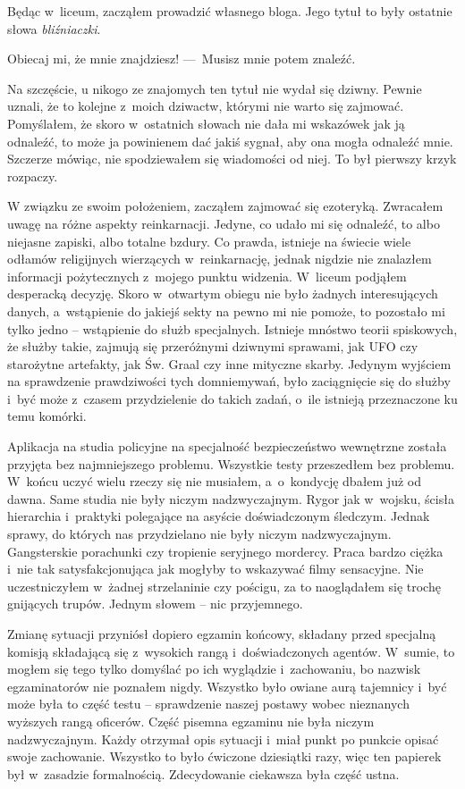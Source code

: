 Będąc w~liceum, zacząłem prowadzić własnego bloga. Jego tytuł to były ostatnie słowa \emph{bliźniaczki}. 

\begin{itquote}
Obiecaj mi, że mnie znajdziesz!
---~Musisz mnie potem znaleźć.
\end{itquote}

Na szczęście, u nikogo ze znajomych ten tytuł nie wydał się dziwny. Pewnie uznali, że to kolejne z~moich dziwactw, którymi nie warto się zajmować. Pomyślałem, że skoro w~ostatnich słowach nie dała mi wskazówek jak ją odnaleźć, to może ja powinienem dać jakiś sygnał, aby ona mogła odnaleźć mnie. Szczerze mówiąc, nie spodziewałem się wiadomości od niej. To był pierwszy krzyk rozpaczy. 

W związku ze swoim położeniem, zacząłem zajmować się ezoteryką. Zwracałem uwagę na różne aspekty reinkarnacji. Jedyne, co udało mi się odnaleźć, to albo niejasne zapiski, albo totalne bzdury. Co prawda, istnieje na świecie wiele odłamów religijnych wierzących w~reinkarnację, jednak nigdzie nie znalazłem informacji pożytecznych z~mojego punktu widzenia. W~liceum podjąłem desperacką decyzję. Skoro w~otwartym obiegu nie było żadnych interesujących danych, a~wstąpienie do jakiejś sekty na pewno mi nie pomoże, to pozostało mi tylko jedno -- wstąpienie do służb specjalnych. Istnieje mnóstwo teorii spiskowych, że służby takie, zajmują się przeróżnymi dziwnymi sprawami, jak UFO czy starożytne artefakty, jak Św. Graal czy inne mityczne skarby. Jedynym wyjściem na sprawdzenie prawdziwości tych domniemywań, było zaciągnięcie się do służby i~być może z~czasem przydzielenie do takich zadań, o~ile istnieją przeznaczone ku temu komórki. 

Aplikacja na studia policyjne na specjalność bezpieczeństwo wewnętrzne została przyjęta bez najmniejszego problemu. Wszystkie testy przeszedłem bez problemu. W~końcu uczyć wielu rzeczy się nie musiałem, a~o~kondycję dbałem już od dawna. Same studia nie były niczym nadzwyczajnym. Rygor jak w~wojsku, ścisła hierarchia i~praktyki polegające na asyście doświadczonym śledczym. Jednak sprawy, do których nas przydzielano nie były niczym nadzwyczajnym. Gangsterskie porachunki czy tropienie seryjnego mordercy. Praca bardzo ciężka i~nie tak satysfakcjonująca jak mogłyby to wskazywać filmy sensacyjne. Nie uczestniczyłem w~żadnej strzelaninie czy pościgu, za to naoglądałem się trochę gnijących trupów. Jednym słowem -- nic przyjemnego. 

Zmianę sytuacji przyniósł dopiero egzamin końcowy, składany przed specjalną komisją składającą się z~wysokich rangą i~doświadczonych agentów. W~sumie, to mogłem się tego tylko domyślać po ich wyglądzie i~zachowaniu, bo nazwisk egzaminatorów nie poznałem nigdy. Wszystko było owiane aurą tajemnicy i~być może była to część testu -- sprawdzenie naszej postawy wobec nieznanych wyższych rangą oficerów. Część pisemna egzaminu nie była niczym nadzwyczajnym. Każdy otrzymał opis sytuacji i~miał punkt po punkcie opisać swoje zachowanie. Wszystko to było ćwiczone dziesiątki razy, więc ten papierek był w~zasadzie formalnością. Zdecydowanie ciekawsza była część ustna. 

